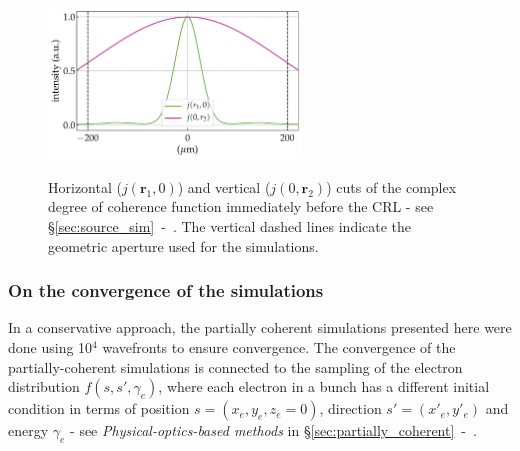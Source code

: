 \begin{refsection}
\begin{figure}[t]
        \centering
        {\includegraphics[height=4cm]{figures/ch05/source/CdoC.pdf}}
        \caption[Complex degree of coherence]{Horizontal ($j(\textbf{r}_1,0)$) and vertical ($j(0,\textbf{r}_2)$) cuts of the complex degree of coherence function immediately before the CRL - see \S\ref{sec:source_sim}~-~\textit{}. The vertical dashed lines indicate the geometric aperture used for the simulations. 
        }\label{fig:CDoC}
\end{figure}
\subsubsection*{On the convergence of the simulations}
In a conservative approach, the partially coherent simulations presented here were done using 10$^{4}$ wavefronts to ensure convergence.
The convergence of the partially-coherent simulations is connected to the sampling of the electron distribution $f(s,s',\gamma_e)$, where each electron in a bunch has a different initial condition in terms of position $s=(x_e,y_e,z_e=0)$, direction $s'=(x'_e,y'_e)$ and energy $\gamma_e$ - see \textit{Physical-optics-based methods} in \S\ref{sec:partially_coherent}~-~\textit{}. %

\begin{table}[t]
\caption[Electron-beam parameters for the ESRF-ESB, the old ESRF-low $\beta$ and the old ESRF-high $\beta$ straight sections]{}\label{tab:E_beam_param}
\centering
\begin{tabular}{rccc}


\end{tabular}
\end{table}
\end{refsection}
